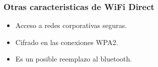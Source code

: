 \begin{frame}
  \frametitle{Otras caracteristicas de WiFi Direct}
  \begin{itemize}
  \item Acceso a redes corporativas seguras.
    \pause
  \item Cifrado en las conexiones WPA2.
    \pause
  \item Es un posible reemplazo al bluetooth.
  \end{itemize}
\end{frame}

